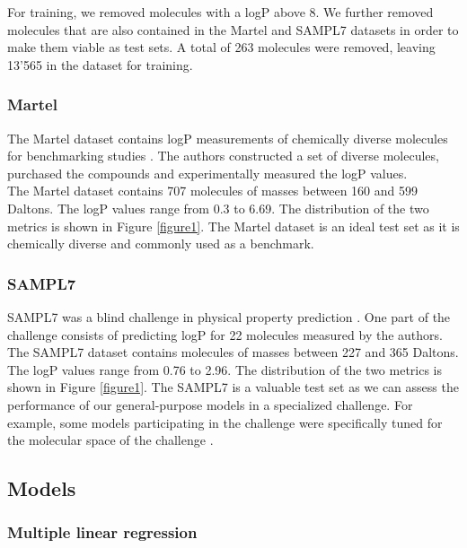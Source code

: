 \documentclass{article}
\theoremstyle{definition}
\theoremstyle{remark}
\begin{document}
For training, we removed molecules with a logP above 8. We further removed molecules that are also contained in the Martel and SAMPL7 datasets in order to make them viable as test sets. A total of 263 molecules were removed, leaving 13'565 in the dataset for training.

\subsubsection{Martel}

The Martel dataset contains logP measurements of chemically diverse molecules for benchmarking studies \cite{martel2013large}. The authors constructed a set of diverse molecules, purchased the compounds and experimentally measured the logP values. \\

The Martel dataset contains 707 molecules of masses between 160 and 599 Daltons. The logP values range from 0.3 to 6.69. The distribution of the two metrics is shown in Figure \ref{figure1}. The Martel dataset is an ideal test set as it is chemically diverse and commonly used as a benchmark.

\subsubsection{SAMPL7}

SAMPL7 was a blind challenge in physical property prediction \cite{bergazin2021evaluation}. One part of the challenge consists of predicting logP for 22 molecules measured by the authors. \\

The SAMPL7 dataset contains molecules of masses between 227 and 365 Daltons. The logP values range from 0.76 to 2.96. The distribution of the two metrics is shown in Figure \ref{figure1}. The SAMPL7 is a valuable test set as we can assess the performance of our general-purpose models in a specialized challenge. For example, some models participating in the challenge were specifically tuned for the molecular space of the challenge \cite{lenselink2021multitask}.

\subsection{Models}
\subsubsection{Multiple linear regression}
\end{document}
